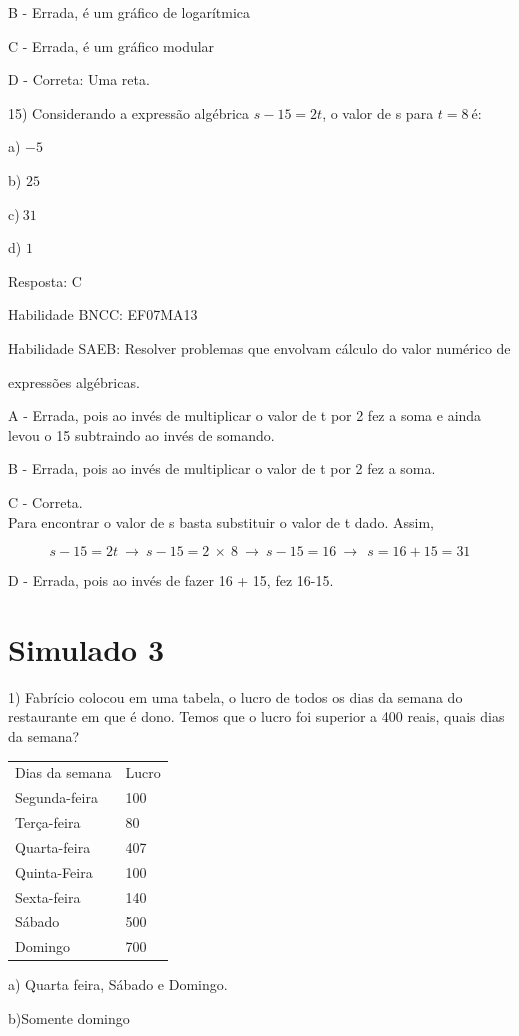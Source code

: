 B - Errada, é um gráfico de logarítmica

C - Errada, é um gráfico modular

D - Correta: Uma reta.

15) Considerando a expressão algébrica \(s - 15 = 2t\), o valor de s
para \(t = 8\ \)é:

a) \(- 5\)

b) \(25\)

c)\(\ 31\)

d) \(1\)

Resposta: C

Habilidade BNCC: EF07MA13

Habilidade SAEB: Resolver problemas que envolvam cálculo do valor
numérico de

expressões algébricas.

A - Errada, pois ao invés de multiplicar o valor de t por 2 fez a soma e
ainda levou o 15 subtraindo ao invés de somando.

B - Errada, pois ao invés de multiplicar o valor de t por 2 fez a soma.

C - Correta.\\
Para encontrar o valor de s basta substituir o valor de t dado. Assim,

\[s - 15 = 2t\  \rightarrow \ s - 15 = 2\  \times \ 8\  \rightarrow \ s - 15 = 16\  \rightarrow \ \ s = 16 + 15 = 31\]

D - Errada, pois ao invés de fazer 16 + 15, fez 16-15.

\hypertarget{simulado-3}{%
\section{Simulado 3}\label{simulado-3}}

1) Fabrício colocou em uma tabela, o lucro de todos os dias da semana do
restaurante em que é dono. Temos que o lucro foi superior a 400 reais,
quais dias da semana?

\begin{longtable}[]{@{}ll@{}}
\toprule
\endhead
Dias da semana & Lucro\tabularnewline
Segunda-feira & 100\tabularnewline
Terça-feira & 80\tabularnewline
Quarta-feira & 407\tabularnewline
Quinta-Feira & 100\tabularnewline
Sexta-feira & 140\tabularnewline
Sábado & 500\tabularnewline
Domingo & 700\tabularnewline
\bottomrule
\end{longtable}

a) Quarta feira, Sábado e Domingo.

b)Somente domingo

